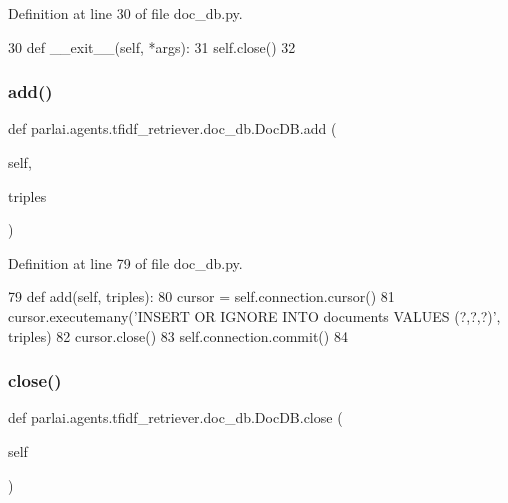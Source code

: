 Definition at line 30 of file doc\+\_\+db.\+py.


\begin{DoxyCode}
30     \textcolor{keyword}{def }\_\_exit\_\_(self, *args):
31         self.close()
32 
\end{DoxyCode}
\mbox{\label{classparlai_1_1agents_1_1tfidf__retriever_1_1doc__db_1_1DocDB_a1396ab4ee21042e24c3b0ed022258071}} 
\subsubsection{\texorpdfstring{add()}{add()}}
{\footnotesize\ttfamily def parlai.\+agents.\+tfidf\+\_\+retriever.\+doc\+\_\+db.\+Doc\+D\+B.\+add (\begin{DoxyParamCaption}\item[{}]{self,  }\item[{}]{triples }\end{DoxyParamCaption})}



Definition at line 79 of file doc\+\_\+db.\+py.


\begin{DoxyCode}
79     \textcolor{keyword}{def }add(self, triples):
80         cursor = self.connection.cursor()
81         cursor.executemany(\textcolor{stringliteral}{'INSERT OR IGNORE INTO documents VALUES (?,?,?)'}, triples)
82         cursor.close()
83         self.connection.commit()
84 \end{DoxyCode}
\mbox{\label{classparlai_1_1agents_1_1tfidf__retriever_1_1doc__db_1_1DocDB_a080619f722b8a5c83ec934d3d1391a01}} 
\subsubsection{\texorpdfstring{close()}{close()}}
{\footnotesize\ttfamily def parlai.\+agents.\+tfidf\+\_\+retriever.\+doc\+\_\+db.\+Doc\+D\+B.\+close (\begin{DoxyParamCaption}\item[{}]{self }\end{DoxyParamCaption})}

